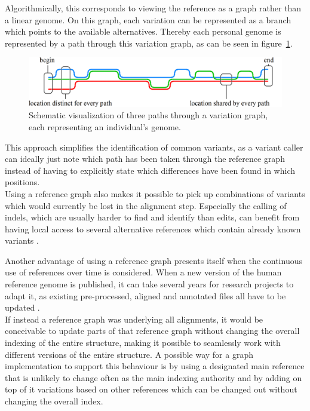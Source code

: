 \documentclass[a4paper,12pt,twoside,BCOR=10mm]{scrbook}
\begin{document}
Algorithmically, this corresponds to viewing the reference as a graph rather than a linear genome. 
On this graph, each variation can be represented as a branch which points to the available alternatives. 
Thereby each personal genome is represented by a path through this variation graph, 
as can be seen in figure~\ref{fig:evo_intro_three_ref_seq_align}. \\
\begin{figure}[!htb]
\centering
\includegraphics[width=\textwidth]{evo_intro_three_ref_seq_align.png}
\caption[Schematic visualization of three paths through a variation graph]{Schematic visualization of three paths through a variation graph, each representing an individual's genome.} \label{fig:evo_intro_three_ref_seq_align}
\end{figure}
This approach simplifies the identification of common variants, as a variant caller can 
ideally just note which path has been taken through the reference graph instead of having to 
explicitly state which differences have been found in which positions. \\
Using a reference graph also makes it possible to pick up combinations of variants 
which would currently be lost in the alignment step. 
Especially the calling of indels, which are usually harder to find and identify than edits, 
can benefit from having local access to several alternative references which contain 
already known variants \citep{Albers2010}.

Another advantage of using a reference graph presents itself when the continuous use of 
references over time is considered. 
When a new version of the human reference genome is published, 
it can take several years for research projects to adapt it, 
as existing pre-processed, aligned and annotated files all have to be updated \citep{RedditSwitchTo38}. \\
If instead a reference graph was underlying all alignments, it would be conceivable 
to update parts of that reference graph without changing the overall indexing of the entire structure, 
making it possible to seamlessly work with different versions of the entire structure. 
A possible way for a graph implementation to support this behaviour is by using a designated main 
reference that is unlikely to change often as the main indexing authority and by adding on top of it 
variations based on other references which can be changed out without changing the overall index.
\end{document}
